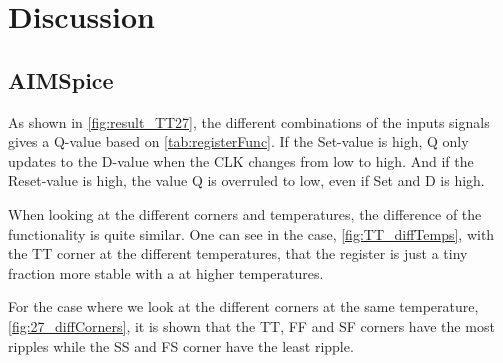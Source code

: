 \section{Discussion}
\label{sec: Discussion}


\subsection{AIMSpice}

As shown in \autoref{fig:result_TT27}, the different combinations of the inputs signals gives a Q-value based on \autoref{tab:registerFunc}. If the Set-value is high, Q only updates to the D-value when the CLK changes from low to high. And if the Reset-value is high, the value Q is overruled to low, even if Set and D is high. 

When looking at the different corners and temperatures, the difference of the functionality is quite similar. One can see in the case, \autoref{fig:TT_diffTemps}, with the TT corner at the different temperatures, that the register is just a tiny fraction more stable with a at higher temperatures.

For the case where we look at the different corners at the same temperature, \autoref{fig:27_diffCorners}, it is shown that the TT, FF and SF corners have the most ripples while the SS and FS corner have the least ripple.



